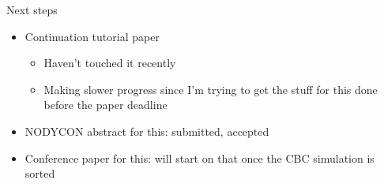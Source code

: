 \documentclass[presentation]{beamer}
\begin{document}
\begin{frame}[plain,label={sec:orga31b052}]{Next steps}
\begin{itemize}
\item Continuation tutorial paper
\begin{itemize}
\item Haven't touched it recently
\item Making slower progress since I'm trying to get the stuff for this done before the paper deadline
\end{itemize}

\item NODYCON abstract for this: submitted, accepted

\item Conference paper for this: will start on that once the CBC simulation is sorted
\end{itemize}
\end{frame}
\end{document}
